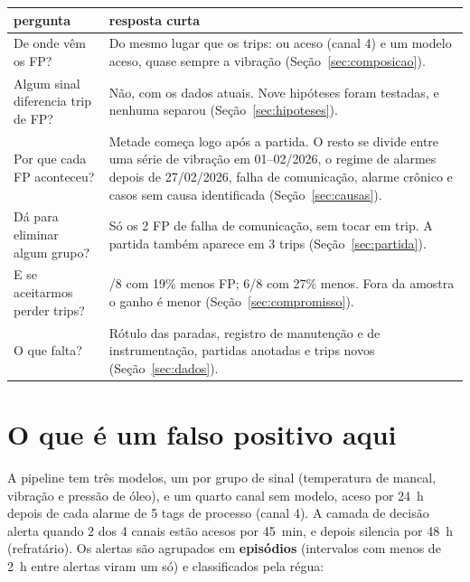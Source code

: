 \documentclass[11pt,a4paper]{article}
\newcommand{\tg}[1]{\texttt{\detokenize{#1}}}
\begin{document}
\begin{table}[H]
\centering\small
\begin{tabular}{>{\raggedright\arraybackslash}p{6.2cm} >{\raggedright\arraybackslash}p{9cm}}
\toprule
pergunta & resposta curta \\
\midrule
De onde vêm os FP? & Do mesmo lugar que os trips: \tg{PI_6240319_AL} ou \tg{PAL_6240315} aceso (canal 4) e um
modelo aceso, quase sempre a vibração (Seção~\ref{sec:composicao}). \\
Algum sinal diferencia trip de FP? & Não, com os dados atuais. Nove hipóteses foram testadas, e nenhuma separou
(Seção~\ref{sec:hipoteses}). \\
Por que cada FP aconteceu? & Metade começa logo após a partida. O resto se divide entre uma série de vibração em
01--02/2026, o regime de alarmes depois de 27/02/2026, falha de comunicação, alarme crônico e casos sem causa
identificada (Seção~\ref{sec:causas}). \\
Dá para eliminar algum grupo? & Só os 2 FP de falha de comunicação, sem tocar em trip. A partida também aparece em 3
trips (Seção~\ref{sec:partida}). \\
E se aceitarmos perder trips? & 7/8 com 19\% menos FP; 6/8 com 27\% menos. Fora da amostra o ganho é menor
(Seção~\ref{sec:compromisso}). \\
O que falta? & Rótulo das paradas, registro de manutenção e de instrumentação, partidas anotadas e trips novos
(Seção~\ref{sec:dados}). \\
\bottomrule
\end{tabular}
\end{table}

\section{O que é um falso positivo aqui}
\label{sec:definicao}

A pipeline tem três modelos, um por grupo de sinal (temperatura de mancal, vibração e pressão de óleo), e um quarto
canal sem modelo, aceso por 24~h depois de cada alarme de 5 tags de processo (canal 4). A camada de decisão alerta
quando 2 dos 4 canais estão acesos por 45~min, e depois silencia por 48~h (refratário). Os alertas são agrupados em
\textbf{episódios} (intervalos com menos de 2~h entre alertas viram um só) e classificados pela régua:
\end{document}
